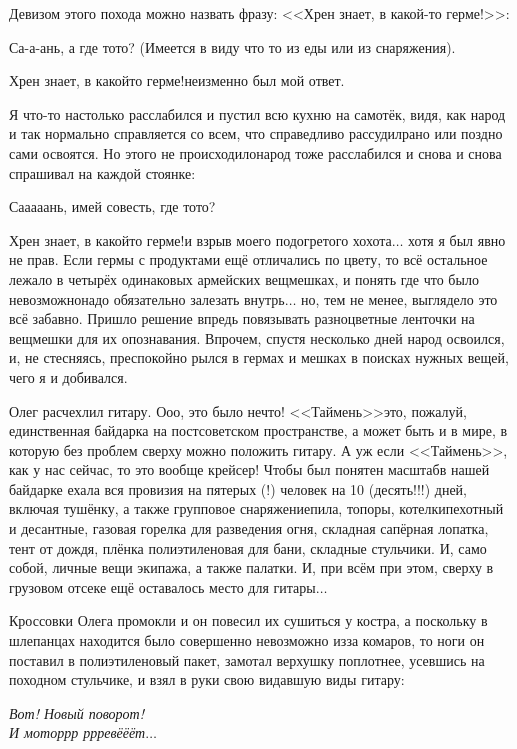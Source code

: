 Девизом этого похода можно назвать фразу: <<Хрен знает, в какой-то герме!>>:

\diagdash Са-а-ань, а где то\sdash то? (Имеется в виду что то из еды или из снаряжения). 

\diagdash Хрен знает, в какой\sdash то герме!\mdash неизменно был мой ответ. 

Я что-то настолько расслабился и пустил всю кухню на самотёк, видя, как народ и так нормально справляется со всем, что справедливо рассудил\mdash рано или поздно сами освоятся. Но этого не происходило\mdash народ тоже расслабился и снова и снова спрашивал на каждой стоянке: 

\diagdash Са\sdash а\sdash а\sdash а\sdash ань, имей совесть, где то\sdash то? 

\diagdash Хрен знает, в какой\sdash то герме!\mdash и взрыв моего подогретого хохота$\ldots$ хотя я был явно не прав. Если гермы с продуктами ещё отличались по цвету, то всё остальное лежало в четырёх одинаковых армейских вещмешках, и понять где что было невозможно\mdash надо обязательно залезать внутрь$\ldots$ но, тем не менее, выглядело это всё забавно. Пришло решение впредь повязывать разноцветные ленточки на вещмешки для их опознавания. Впрочем, спустя несколько дней народ освоился, и, не стесняясь, преспокойно рылся в гермах и мешках в поисках нужных вещей, чего я и добивался.

Олег расчехлил гитару. О\sdash о\sdash о, это было нечто! <<Таймень>>\mdash это, пожалуй, единственная байдарка на постсоветском пространстве, а может быть и в мире, в которую без проблем сверху можно положить гитару. А уж если <<Таймень>>, как у нас сейчас, то это вообще крейсер! Чтобы был понятен масштаб\mdash в нашей байдарке ехала вся провизия на пятерых (!) человек на 10 (десять!!!) дней, включая тушёнку, а также групповое снаряжение\mdash пила, топоры, котелки\mdash пехотный и десантные, газовая горелка для разведения огня, складная сапёрная лопатка, тент от дождя, плёнка полиэтиленовая для бани, складные стульчики. И, само собой, личные вещи экипажа, а также палатки. И, при всём при этом, сверху в грузовом отсеке ещё оставалось место для гитары$\ldots$

Кроссовки Олега промокли и он повесил их сушиться у костра, а поскольку в шлепанцах находится было совершенно невозможно из\sdash за комаров, то ноги он поставил в полиэтиленовый пакет, замотал верхушку поплотнее, усевшись на походном стульчике, и взял в руки свою видавшую виды гитару:

\vspace{0.1cm}
\noindent\textit{%
	\hspace*{3.5cm}Вот! Новый поворот!\\
	\hspace*{3.5cm}И мотор\sdash р\sdash р  р\sdash р\sdash ревё\sdash ё\sdash ёт$\ldots$
}
\vspace{0.1cm}

